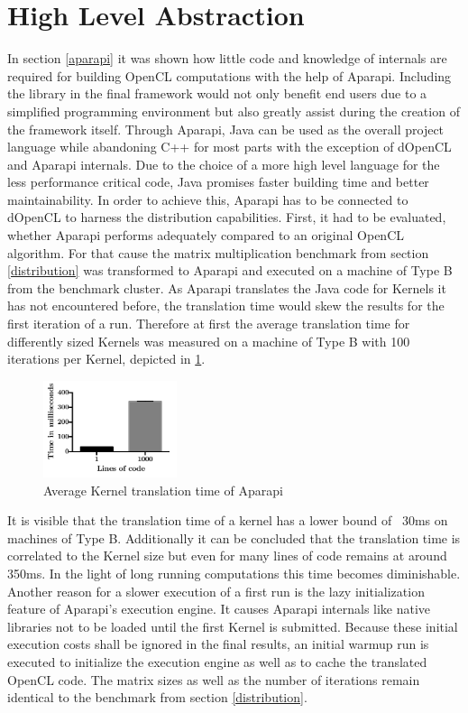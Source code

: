 \section{High Level Abstraction}
\label{abstraction}

In section \ref{aparapi} it was shown how little code and knowledge of internals are required for building OpenCL computations with the help of Aparapi. Including the library in the final framework would not only benefit end users due to a simplified programming environment but also greatly assist during the creation of the framework itself. Through Aparapi, Java can be used as the overall project language while abandoning C++ for most parts with the exception of dOpenCL and Aparapi internals. Due to the choice of a more high level language for the less performance critical code, Java promises faster building time and better maintainability. In order to achieve this, Aparapi has to be connected to dOpenCL to harness the distribution capabilities. First, it had to be evaluated, whether Aparapi performs adequately compared to an original OpenCL algorithm. For that cause the matrix multiplication benchmark from section \ref{distribution} was transformed to Aparapi and executed on a machine of Type B from the benchmark cluster. As Aparapi translates the Java code for Kernels it has not encountered before, the translation time would skew the results for the first iteration of a run. Therefore at first the average translation time for differently sized Kernels was measured on a machine of Type B with 100 iterations per Kernel, depicted in \ref{img:aparapi_translation}.

\begin{figure}[!htb]
	\includegraphics[width=0.35\textwidth]{images/aparapi_translation.pdf}
	\centering
	\caption{Average Kernel translation time of Aparapi}
	\label{img:aparapi_translation}
\end{figure}

It is visible that the translation time of a kernel has a lower bound of ~30ms on machines of Type B. Additionally it can be concluded that the translation time is correlated to the Kernel size but even for many lines of code remains at around 350ms. In the light of long running computations this time becomes diminishable. Another reason for a slower execution of a first run is the lazy initialization feature of Aparapi's execution engine. It causes Aparapi internals like native libraries not to be loaded until the first Kernel is submitted. Because these initial execution costs shall be ignored in the final results, an initial warmup run is executed to initialize the execution engine as well as to cache the translated OpenCL code. The matrix sizes as well as the number of iterations remain identical to the benchmark from section \ref{distribution}.

